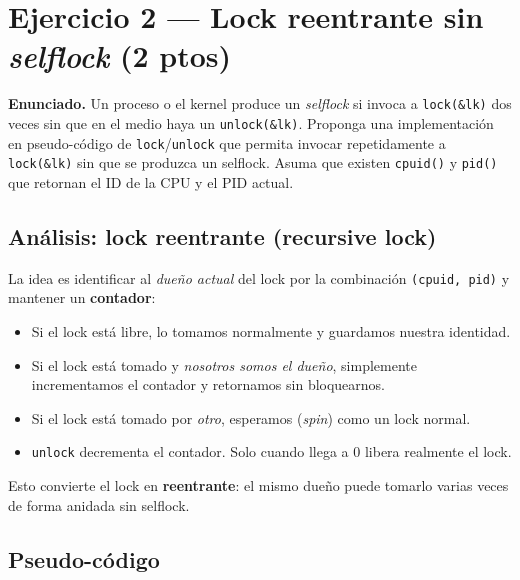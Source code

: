 \documentclass[11pt,a4paper]{article}
\begin{document}
\section{Ejercicio 2 --- Lock reentrante sin \emph{selflock} (2 ptos)}

\textbf{Enunciado.} Un proceso o el kernel produce un \emph{selflock}
si invoca a \texttt{lock(\&lk)} dos veces sin que en el medio haya un
\texttt{unlock(\&lk)}. Proponga una implementación en pseudo-código
de \texttt{lock}/\texttt{unlock} que permita invocar repetidamente a
\texttt{lock(\&lk)} sin que se produzca un selflock. Asuma que
existen \texttt{cpuid()} y \texttt{pid()} que retornan el ID de la
CPU y el PID actual.

\subsection*{Análisis: lock reentrante (recursive lock)}

La idea es identificar al \emph{dueño actual} del lock por la
combinación \texttt{(cpuid, pid)} y mantener un \textbf{contador}:

\begin{itemize}[leftmargin=*,nosep]
    \item Si el lock está libre, lo tomamos normalmente y guardamos
        nuestra identidad.
    \item Si el lock está tomado y \emph{nosotros somos el dueño},
        simplemente incrementamos el contador y retornamos sin
        bloquearnos.
    \item Si el lock está tomado por \emph{otro}, esperamos
        (\emph{spin}) como un lock normal.
    \item \texttt{unlock} decrementa el contador. Solo cuando llega
        a $0$ libera realmente el lock.
\end{itemize}

Esto convierte el lock en \textbf{reentrante}: el mismo dueño puede
tomarlo varias veces de forma anidada sin selflock.

\subsection*{Pseudo-código}
\end{document}
